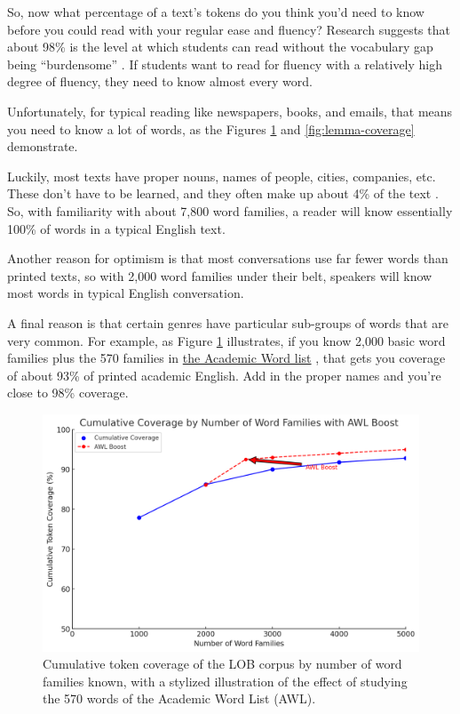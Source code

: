 \medskip

So, now what percentage of a text's tokens do you think you'd need to know before you could read with your regular ease and fluency? Research suggests that about 98\% is the level at which students can read without the vocabulary gap being ``burdensome'' \citep{Hu2000}. If students want to read for fluency with a relatively high degree of fluency, they need to know almost every word.

Unfortunately, for typical reading like newspapers, books, and emails, that means you need to know a lot of words, as the Figures \ref{fig:AWL boost} and \ref{fig:lemma-coverage} demonstrate.

Luckily, most texts have proper nouns, names of people, cities, companies, etc. These don't have to be learned, and they often make up about 4\% of the text \citep[29]{Nation2022}. So, with familiarity with about 7,800 word families, a reader will know essentially 100\% of words in a typical English text.

Another reason for optimism is that most conversations use far fewer words than printed texts, so with 2,000 word families under their belt, speakers will know most words in typical English conversation.

A final reason is that certain genres have particular sub-groups of words that are very common. For example, as Figure \ref{fig:AWL boost} illustrates, if you know 2,000 basic word families plus the 570 families in \href{https://simple.wiktionary.org/wiki/Wiktionary:Academic_word_list}{the Academic Word list} \citep{coxhead2000academic}, that gets you coverage of about 93\% of printed academic English. Add in the proper names and you're close to 98\% coverage.

\begin{figure}
    \centering
    \includegraphics[width=0.8\linewidth]{figures/AWLboost.png}
    \caption{Cumulative token coverage of the LOB corpus by number of word families known, with a stylized illustration of the effect of studying the 570 words of the Academic Word List (AWL).}
    \label{fig:AWL boost}
\end{figure}


